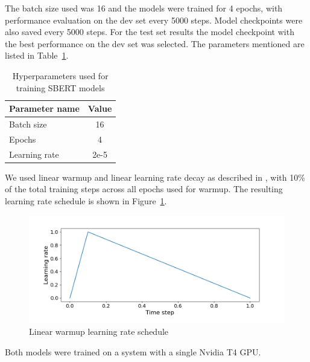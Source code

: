 \documentclass[10pt, a4paper]{article}
\begin{document}
The batch size used was 16 and the models were trained for 4 epochs, with performance evaluation on the dev set every 5000 steps. Model checkpoints were also saved every 5000 steps.
For the test set results the model checkpoint with the best performance on the dev set was selected. The parameters mentioned are listed in Table~\ref{tab:train-params}.

\begin{table}
\caption{Hyperparameters used for training SBERT models}
\label{tab:train-params}
\begin{center}
\begin{tabular}{lc}
\toprule
\textbf{Parameter name} & \textbf{Value} \\
\midrule
Batch size   & 16 \\
Epochs  & 4 \\
Learning rate & 2e-5 \\
\bottomrule
\end{tabular}
\end{center}
\end{table}

We used linear warmup and linear learning rate decay as described in \citet{devlin2018bert}, with 10\% of the total training steps across all epochs used for warmup.
The resulting learning rate schedule is shown in Figure~\ref{fig:warmup-schedule}.

\begin{figure}
\begin{center}
\includegraphics[width=\columnwidth]{figures/warmup-schedule.png}
\caption{Linear warmup learning rate schedule}
\label{fig:warmup-schedule}
\end{center}
\end{figure}

Both models were trained on a system with a single Nvidia T4 GPU.
\end{document}
